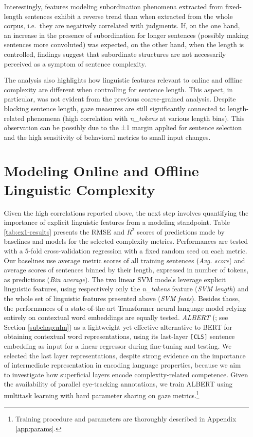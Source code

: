 \documentclass[a4paper, nobind]{templates/ociamthesis}
\begin{document}
Interestingly, features modeling subordination phenomena extracted from fixed-length sentences exhibit a reverse trend than when extracted from the whole corpus, i.e.~they are negatively correlated with judgments. If, on the one hand, an increase in the presence of subordination for longer sentences (possibly making sentences more convoluted) was expected, on the other hand, when the length is controlled, findings suggest that subordinate structures are not necessarily perceived as a symptom of sentence complexity.

The analysis also highlights how linguistic features relevant to online and offline complexity are different when controlling for sentence length. This aspect, in particular, was not evident from the previous coarse-grained analysis. Despite blocking sentence length, gaze measures are still significantly connected to length-related phenomena (high correlation with \emph{n\_tokens} at various length bins). This observation can be possibly due to the ±1 margin applied for sentence selection and the high sensitivity of behavioral metrics to small input changes.

\hypertarget{subchap:ex1-modeling}{%
\section{Modeling Online and Offline Linguistic Complexity}\label{subchap:ex1-modeling}}

Given the high correlations reported above, the next step involves quantifying the importance of explicit linguistic features from a modeling standpoint. Table \ref{tab:ex1-results} presents the RMSE and \(R^2\) scores of predictions made by baselines and models for the selected complexity metrics. Performances are tested with a 5-fold cross-validation regression with a fixed random seed on each metric. Our baselines use average metric scores of all training sentences (\emph{Avg. score}) and average scores of sentences binned by their length, expressed in number of tokens, as predictions (\emph{Bin average}). The two linear SVM models leverage explicit linguistic features, using respectively only the \emph{n\_tokens} feature (\emph{SVM length}) and the whole set of linguistic features presented above (\emph{SVM feats}). Besides those, the performances of a state-of-the-art Transformer neural language model relying entirely on contextual word embeddings are equally tested. \emph{ALBERT} (\textcite{lan-etal-2020-albert}; see Section \ref{subchap:nlm}) as a lightweight yet effective alternative to BERT \autocite{devlin-etal-2019-bert} for obtaining contextual word representations, using its last-layer \texttt{{[}CLS{]}} sentence embedding as input for a linear regressor during fine-tuning and testing. We selected the last layer representations, despite strong evidence on the importance of intermediate representation in encoding language properties, because we aim to investigate how superficial layers encode complexity-related competence. Given the availability of parallel eye-tracking annotations, we train ALBERT using multitask learning with hard parameter sharing \autocite{caruana-1997-multitask} on gaze metrics.\footnote{Training procedure and parameters are thoroughly described in Appendix \ref{app:params}.}
\end{document}
